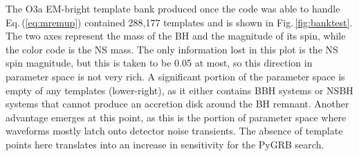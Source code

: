\documentclass[binding=0.6cm, LaM]{sapthesis}
\begin{document}

	The O3a EM-bright template bank produced once the code was able to handle Eq.\,(\ref{eq:mremup}) contained 288,177 templates and is shown in Fig.\,\ref{fig:banktest}.  The two axes represent the mass of the BH and the magnitude of its spin, while the color code is the NS mass.  The only information lost in this plot is the NS spin magnitude, but this is taken to be 0.05 at most, so this direction in parameter space is not very rich.
        A significant portion of the parameter space is empty of any templates (lower-right),
        as it either contains BBH systems or NSBH systems that cannot produce an accretion disk around the BH remnant.
        Another advantage emerges at this point, as this is the portion of parameter space where waveforms mostly latch onto detector noise transients.  The absence of template points here translates into an increase in sensitivity for the {\rm PyGRB} search.
\end{document}
